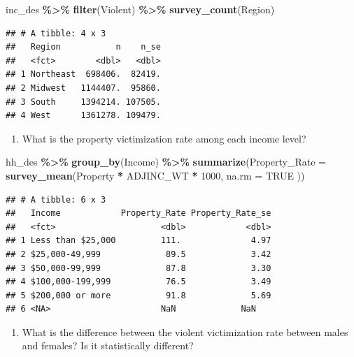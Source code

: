 \documentclass[
]{krantz}
\makeatletter
\newenvironment{Shaded}{\begin{snugshade}}{\end{snugshade}}
\newcommand{\AttributeTok}[1]{\textcolor[rgb]{0.27,0.27,0.27}{#1}}
\newcommand{\ConstantTok}[1]{\textcolor[rgb]{0.37,0.37,0.37}{#1}}
\newcommand{\DecValTok}[1]{\textcolor[rgb]{0.06,0.06,0.06}{#1}}
\newcommand{\FunctionTok}[1]{\textcolor[rgb]{0.27,0.27,0.27}{\textbf{#1}}}
\newcommand{\NormalTok}[1]{#1}
\newcommand{\SpecialCharTok}[1]{\textcolor[rgb]{0.43,0.43,0.43}{\textbf{#1}}}
\providecommand{\tightlist}{%
  \setlength{\itemsep}{0pt}\setlength{\parskip}{0pt}}
\newenvironment{kframe}{%
\medskip{}
\setlength{\fboxsep}{.8em}
 \def\at@end@of@kframe{}%
 \ifinner\ifhmode%
  \def\at@end@of@kframe{\end{minipage}}%
  \begin{minipage}{\columnwidth}%
 \fi\fi%
 \def\FrameCommand##1{\hskip\@totalleftmargin \hskip-\fboxsep
 \colorbox{shadecolor}{##1}\hskip-\fboxsep
     \hskip-\linewidth \hskip-\@totalleftmargin \hskip\columnwidth}%
 \MakeFramed {\advance\hsize-\width
   \@totalleftmargin\z@ \linewidth\hsize
   \@setminipage}}%
 {\par\unskip\endMakeFramed%
 \at@end@of@kframe}
\renewenvironment{Shaded}{\begin{kframe}}{\end{kframe}}
\makeatother
\begin{document}
\begin{Shaded}
\begin{Highlighting}[]
\NormalTok{inc\_des }\SpecialCharTok{\%\textgreater{}\%}
  \FunctionTok{filter}\NormalTok{(Violent) }\SpecialCharTok{\%\textgreater{}\%}
  \FunctionTok{survey\_count}\NormalTok{(Region)}
\end{Highlighting}
\end{Shaded}

\begin{verbatim}
## # A tibble: 4 x 3
##   Region           n    n_se
##   <fct>        <dbl>   <dbl>
## 1 Northeast  698406.  82419.
## 2 Midwest   1144407.  95860.
## 3 South     1394214. 107505.
## 4 West      1361278. 109479.
\end{verbatim}

\begin{enumerate}
\def\labelenumi{\arabic{enumi}.}
\setcounter{enumi}{2}
\tightlist
\item
  What is the property victimization rate among each income level?
\end{enumerate}

\begin{Shaded}
\begin{Highlighting}[]
\NormalTok{hh\_des }\SpecialCharTok{\%\textgreater{}\%}
  \FunctionTok{group\_by}\NormalTok{(Income) }\SpecialCharTok{\%\textgreater{}\%}
  \FunctionTok{summarize}\NormalTok{(}\AttributeTok{Property\_Rate =} \FunctionTok{survey\_mean}\NormalTok{(Property }\SpecialCharTok{*}\NormalTok{ ADJINC\_WT }\SpecialCharTok{*} \DecValTok{1000}\NormalTok{,}
    \AttributeTok{na.rm =} \ConstantTok{TRUE}
\NormalTok{  ))}
\end{Highlighting}
\end{Shaded}

\begin{verbatim}
## # A tibble: 6 x 3
##   Income            Property_Rate Property_Rate_se
##   <fct>                     <dbl>            <dbl>
## 1 Less than $25,000         111.              4.97
## 2 $25,000-49,999             89.5             3.42
## 3 $50,000-99,999             87.8             3.30
## 4 $100,000-199,999           76.5             3.49
## 5 $200,000 or more           91.8             5.69
## 6 <NA>                      NaN             NaN
\end{verbatim}

\begin{enumerate}
\def\labelenumi{\arabic{enumi}.}
\setcounter{enumi}{3}
\tightlist
\item
  What is the difference between the violent victimization rate between males and females? Is it statistically different?
\end{enumerate}
\end{document}
